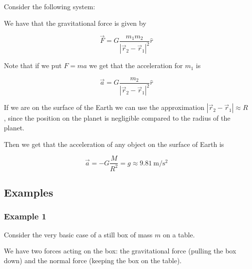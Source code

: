 \documentclass[10pt]{extarticle}
\begin{document}
Consider the following system:

\begin{center}

    \label{fig:gravforce_masses}
\end{center}

We have that the gravitational force is given by

$$
    \vec F = G \frac{ m_1 m_2}{|\vec r_2 - \vec r_1|^2} \hat r
$$

Note that if we put $F = ma$ we get that the acceleration for $m_1$ is

$$
    \vec a = G \frac{m_2}{|\vec r_2 - \vec r_1|^2} \hat r
$$

If we are on the surface of the Earth we can use the approximation $|\vec r_2 - \vec r_1| \approx R$, since the position on the planet is negligible compared to the radius of the planet.

Then we get that the acceleration of any object on the surface of Earth is

$$
    \vec a = - G \frac{M}{R^2} = g \approx \SI{9.81}{\meter \per \second \squared}
$$

\subsection{Examples}

\subsubsection{Example 1}

Consider the very basic case of a still box of mass $m$ on a table.

We have two forces acting on the box: the gravitational force (pulling the box down) and the normal force (keeping the box on the table).
\end{document}
